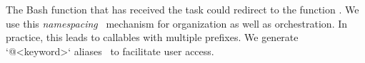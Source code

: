 The Bash function  that has received the task  could redirect to the function . We use this \emph{namespacing}~\cite{namespaces} mechanism for organization as well as orchestration. In practice, this leads to callables with multiple prefixes. We generate `@<keyword>` aliases~\cite{aliases} to facilitate user access. 